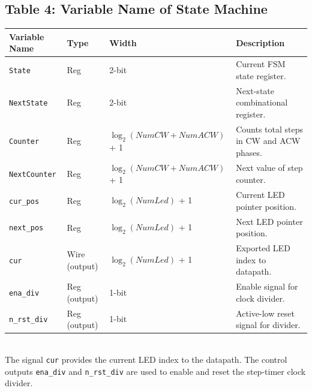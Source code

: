 \subsection*{Table 4: Variable Name of State Machine}
\renewcommand{\arraystretch}{1.2}
\begin{tabular}{p{2.6cm} p{2.2cm} p{3.6cm} p{6.0cm}}
\toprule
\textbf{Variable Name} & \textbf{Type} & \textbf{Width} & \textbf{Description} \\
\midrule
\texttt{State} & Reg & 2-bit & Current FSM state register. \\
\texttt{NextState} & Reg & 2-bit & Next-state combinational register. \\
\texttt{Counter} & Reg & $\log_2(NumCW+NumACW)$ + 1 & Counts total steps in CW and ACW phases. \\
\texttt{NextCounter} & Reg & $\log_2(NumCW+NumACW)$ + 1 & Next value of step counter. \\
\texttt{cur\_pos} & Reg & $\log_2(NumLed)$ + 1 & Current LED pointer position. \\
\texttt{next\_pos} & Reg & $\log_2(NumLed)$ + 1 & Next LED pointer position. \\
\texttt{cur} & Wire (output) & $\log_2(NumLed)$ + 1 & Exported LED index to datapath. \\
\texttt{ena\_div} & Reg (output) & 1-bit & Enable signal for clock divider. \\
\texttt{n\_rst\_div} & Reg (output) & 1-bit & Active-low reset signal for divider. \\
\bottomrule
\end{tabular}
\\
The signal \texttt{cur} provides the current LED index to the datapath. The control outputs \texttt{ena\_div} and \texttt{n\_rst\_div} are used to enable and reset the step-timer clock divider.

